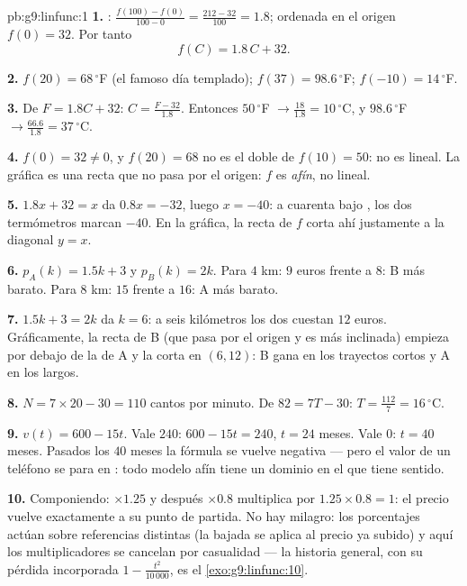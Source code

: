 \begin{solution}{pb:g9:linfunc:1}
\textbf{1.} : $\frac{f(100) - f(0)}{100 - 0} =
\frac{212 - 32}{100} = 1.8$; ordenada en el origen $f(0) = 32$. Por tanto
\[
f(C) = 1.8\,C + 32 .
\]

\textbf{2.} $f(20) = 68\,^\circ$F (el famoso día templado);
$f(37) = 98.6\,^\circ$F; $f(-10) = 14\,^\circ$F.

\textbf{3.} De $F = 1.8C + 32$:
$C = \frac{F - 32}{1.8}$. Entonces $50\,^\circ$F
$\to \frac{18}{1.8} = 10\,^\circ$C, y $98.6\,^\circ$F
$\to \frac{66.6}{1.8} = 37\,^\circ$C.

\textbf{4.} $f(0) = 32 \neq 0$, y $f(20) = 68$ no es el
doble de $f(10) = 50$: no es lineal. La gráfica es una recta
que no pasa por el origen: $f$ es \emph{afín}, no lineal.

\textbf{5.} $1.8x + 32 = x$ da $0.8x = -32$, luego $x = -40$:
a cuarenta bajo , los dos termómetros marcan $-40$. En la gráfica, la
recta de $f$ corta ahí justamente a la diagonal $y = x$.

\textbf{6.} $p_A(k) = 1.5k + 3$ y $p_B(k) = 2k$. Para $4$ km:
$9$ euros frente a $8$: B más barato. Para $8$ km: $15$ frente a
$16$: A más barato.

\textbf{7.} $1.5k + 3 = 2k$ da $k = 6$: a seis kilómetros
los dos cuestan $12$ euros. Gráficamente, la recta de B (que pasa por el
origen y es más inclinada) empieza por debajo de la de A y la corta en
$(6, 12)$: B gana en los trayectos cortos y A en los largos.

\textbf{8.} $N = 7 \times 20 - 30 = 110$ cantos por minuto. De
$82 = 7T - 30$: $T = \frac{112}{7} = 16\,^\circ$C.

\textbf{9.} $v(t) = 600 - 15t$. Vale $240$:
$600 - 15t = 240$, $t = 24$ meses. Vale $0$: $t = 40$ meses.
Pasados los $40$ meses la fórmula se vuelve negativa --- pero el valor de un
teléfono se para en : todo modelo afín tiene un dominio en el que
tiene sentido.

\textbf{10.} Componiendo: $\times 1.25$ y después $\times 0.8$
multiplica por $1.25 \times 0.8 = 1$: el precio vuelve exactamente
a su punto de partida. No hay milagro: los porcentajes actúan sobre referencias
distintas (la bajada se aplica al precio ya subido) y aquí los
multiplicadores se cancelan por casualidad --- la historia general, con su
pérdida incorporada $1 - \frac{t^2}{10\,000}$, es el
\cref{exo:g9:linfunc:10}.


\end{solution}
